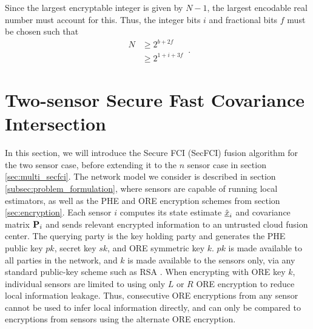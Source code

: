 \documentclass[letterpaper, 10 pt, journal, twoside]{ieeetran}  %
\begin{document}
Since the largest encryptable integer is given by $N-1$, the largest encodable real number must account for this. Thus, the integer bits $i$ and fractional bits $f$ must be chosen such that
\begin{equation}\label{eqn:qmn_max}
   \begin{aligned}
      N &\geq 2^{b+2f}\\
      &\geq 2^{1+i+3f}
   \end{aligned}\,.
\end{equation}




\section{Two-sensor Secure Fast Covariance Intersection} \label{sec:secfci}
In this section, we will introduce the Secure FCI (SecFCI) fusion algorithm for the two sensor case, before extending it to the $n$ sensor case in section \ref{sec:multi_secfci}. The network model we consider is described in section \ref{subsec:problem_formulation}, where sensors are capable of running local estimators, as well as the PHE and ORE encryption schemes from section \ref{sec:encryption}. Each sensor $i$ computes its state estimate $\hat{{\underline{x}}}_i$ and covariance matrix ${{\mathbf{P}}}_i$ and sends relevant encrypted information to an untrusted cloud fusion center. The querying party is the key holding party and generates the PHE public key $pk$, secret key $sk$, and ORE symmetric key $k$. $pk$ is made available to all parties in the network, and $k$ is made available to the sensors only, via any standard public-key scheme such as RSA \cite{rivestMethodObtainingDigital1978}. When encrypting with ORE key $k$, individual sensors are limited to using only $L$ or $R$ ORE encryption to reduce local information leakage. Thus, consecutive ORE encryptions from any sensor cannot be used to infer local information directly, and can only be compared to encryptions from sensors using the alternate ORE encryption.
\end{document}
